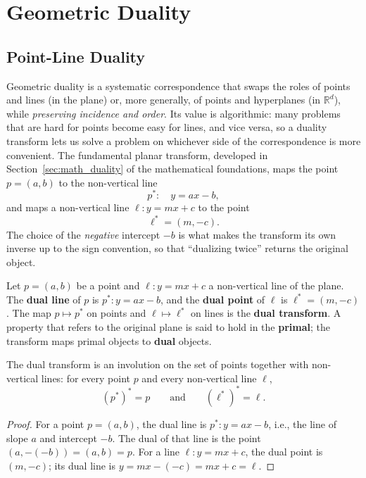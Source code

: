 \chapter{Geometric Duality}
\label{ch:geometric_duality}

\section{Point-Line Duality}
\label{sec:duality_point_line}

Geometric duality is a
systematic correspondence that swaps the roles of points and lines (in the
plane) or, more generally, of points and hyperplanes (in $\mathbb{R}^d$),
while \emph{preserving incidence and order}. Its value is algorithmic: many
problems that are hard for points become easy for lines, and vice versa, so a
duality transform lets us solve a problem on whichever side of the
correspondence is more convenient. The fundamental planar transform,
developed in Section~\ref{sec:math_duality} of the mathematical foundations,
maps the point $p = (a,b)$ to the non-vertical line
\[
  p^* : \quad y = ax - b,
\]
and maps a non-vertical line $\ell : y = mx + c$ to the point
\[
  \ell^* = (m, -c).
\]
The choice of the \emph{negative} intercept $-b$ is what makes the transform
its own inverse up to the sign convention, so that ``dualizing twice''
returns the original object.

\begin{definition}\label{def:geo_duality_transform}
  Let $p = (a,b)$ be a point and $\ell : y = mx + c$ a non-vertical line of
  the plane. The \textbf{dual line} of $p$ is $p^*: y = ax - b$, and the
  \textbf{dual point} of $\ell$ is $\ell^* = (m, -c)$. The map $p \mapsto
  p^*$ on points and $\ell \mapsto \ell^*$ on lines is the \textbf{dual
  transform}. A property that refers to the original plane is said to hold
  in the \textbf{primal}; the transform maps primal objects to
  \textbf{dual} objects.
\end{definition}

\begin{theorem}[Involution]\label{thm:geo_duality_involution}
  The dual transform is an involution on the set of points together with
  non-vertical lines: for every point $p$ and every non-vertical line
  $\ell$,
  \[
    (p^*)^* = p \qquad\text{and}\qquad (\ell^*)^* = \ell .
  \]
\end{theorem}

\begin{proof}
  For a point $p = (a,b)$, the dual line is $p^* : y = ax - b$, i.e., the
  line of slope $a$ and intercept $-b$. The dual of that line is the point
  $(a, -(-b)) = (a,b) = p$. For a line $\ell : y = mx + c$, the dual point
  is $(m, -c)$; its dual line is $y = m x - (-c) = mx + c = \ell$.
\end{proof}

